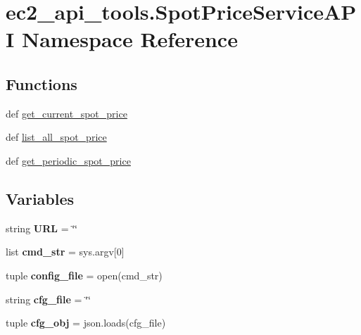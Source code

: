 \hypertarget{namespaceec2__api__tools_1_1SpotPriceServiceAPI}{\section{ec2\-\_\-api\-\_\-tools.\-Spot\-Price\-Service\-A\-P\-I Namespace Reference}
\label{namespaceec2__api__tools_1_1SpotPriceServiceAPI}
}
\subsection*{Functions}
\begin{DoxyCompactItemize}
\item 
def \hyperlink{namespaceec2__api__tools_1_1SpotPriceServiceAPI_a5c6c32697730fa7ab2c9341a549e784a}{get\-\_\-current\-\_\-spot\-\_\-price}
\item 
def \hyperlink{namespaceec2__api__tools_1_1SpotPriceServiceAPI_a7c00b59e6281a0212f8cdbf5395c52af}{list\-\_\-all\-\_\-spot\-\_\-price}
\item 
def \hyperlink{namespaceec2__api__tools_1_1SpotPriceServiceAPI_abbf64c96c77886874ab0a6cd5da392b2}{get\-\_\-periodic\-\_\-spot\-\_\-price}
\end{DoxyCompactItemize}
\subsection*{Variables}
\begin{DoxyCompactItemize}
\item 
\hypertarget{namespaceec2__api__tools_1_1SpotPriceServiceAPI_a2140e4cd848cd858ccf47e25cb843816}{string {\bfseries U\-R\-L} = \char`\"{}\char`\"{}}\label{namespaceec2__api__tools_1_1SpotPriceServiceAPI_a2140e4cd848cd858ccf47e25cb843816}

\item 
\hypertarget{namespaceec2__api__tools_1_1SpotPriceServiceAPI_af389d8a9d560b0172cbbdb313f34c3c9}{list {\bfseries cmd\-\_\-str} = sys.\-argv\mbox{[}0\mbox{]}}\label{namespaceec2__api__tools_1_1SpotPriceServiceAPI_af389d8a9d560b0172cbbdb313f34c3c9}

\item 
\hypertarget{namespaceec2__api__tools_1_1SpotPriceServiceAPI_a4350c24215cf038aeac6072fcfbfdab6}{tuple {\bfseries config\-\_\-file} = open(cmd\-\_\-str)}\label{namespaceec2__api__tools_1_1SpotPriceServiceAPI_a4350c24215cf038aeac6072fcfbfdab6}

\item 
\hypertarget{namespaceec2__api__tools_1_1SpotPriceServiceAPI_a97aed4edbfe15498cadf88773f48eb87}{string {\bfseries cfg\-\_\-file} = \char`\"{}\char`\"{}}\label{namespaceec2__api__tools_1_1SpotPriceServiceAPI_a97aed4edbfe15498cadf88773f48eb87}

\item 
\hypertarget{namespaceec2__api__tools_1_1SpotPriceServiceAPI_aff48fe1d0ae33fb15592664d67075a80}{tuple {\bfseries cfg\-\_\-obj} = json.\-loads(cfg\-\_\-file)}\label{namespaceec2__api__tools_1_1SpotPriceServiceAPI_aff48fe1d0ae33fb15592664d67075a80}

\end{DoxyCompactItemize}


